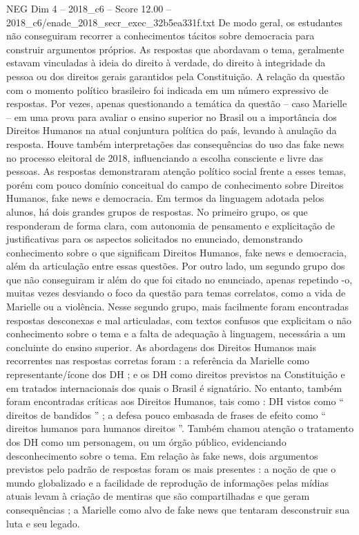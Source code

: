 \begin{textsample}{NEG Dim 4 – 2018\_c6 – Score 12.00 – 2018\_c6/enade\_2018\_secr\_exec\_32b5ea331f.txt}
De modo geral, os estudantes não conseguiram recorrer a conhecimentos tácitos sobre democracia para construir argumentos próprios.
As respostas que abordavam o tema, geralmente estavam vinculadas à ideia do direito à verdade, do direito à integridade da pessoa ou dos direitos gerais garantidos pela Constituição.
A relação da questão com o momento político brasileiro foi indicada em um número expressivo de respostas.
Por vezes, apenas questionando a temática da questão – caso Marielle – em uma prova para avaliar o ensino superior no Brasil ou a importância dos Direitos Humanos na atual conjuntura política do país, levando à anulação da resposta.
Houve também interpretações das consequências do uso das fake news no processo eleitoral de 2018, influenciando a escolha consciente e livre das pessoas.
As respostas demonstraram atenção político social frente a esses temas, porém com pouco domínio conceitual do campo de conhecimento sobre Direitos Humanos, fake news e democracia.
Em termos da linguagem adotada pelos alunos, há dois grandes grupos de respostas.
No primeiro grupo, os que responderam de forma clara, com autonomia de pensamento e explicitação de justificativas para os aspectos solicitados no enunciado, demonstrando conhecimento sobre o que significam Direitos Humanos, fake news e democracia, além da articulação entre essas questões.
Por outro lado, um segundo grupo dos que não conseguiram ir além do que foi citado no enunciado, apenas repetindo -o, muitas vezes desviando o foco da questão para temas correlatos, como a vida de Marielle ou a violência.
Nesse segundo grupo, mais facilmente foram encontradas respostas desconexas e mal articuladas, com textos confusos que explicitam o não conhecimento sobre o tema e a falta de adequação à linguagem, necessária a um concluinte do ensino superior.
As abordagens dos Direitos Humanos mais recorrentes nas respostas corretas foram : a referência da Marielle como representante/ícone dos DH ; e os DH como direitos previstos na Constituição e em tratados internacionais dos quais o Brasil é signatário.
No entanto, também foram encontradas críticas aos Direitos Humanos, tais como : DH vistos como “ direitos de bandidos ” ; a defesa pouco embasada de frases de efeito como “ direitos humanos para humanos direitos ”.
Também chamou atenção o tratamento dos DH como um personagem, ou um órgão público, evidenciando desconhecimento sobre o tema.
Em relação às fake news, dois argumentos previstos pelo padrão de respostas foram os mais presentes : a noção de que o mundo globalizado e a facilidade de reprodução de informações pelas mídias atuais levam à criação de mentiras que são compartilhadas e que geram consequências ; a Marielle como alvo de fake news que tentaram desconstruir sua luta e seu legado.

\end{textsample}
